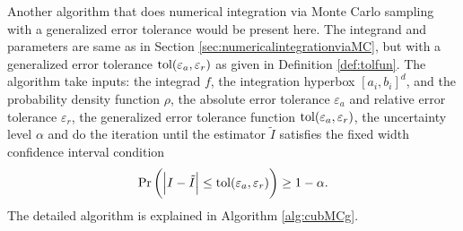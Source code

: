 \documentclass{iitthesis}
\begin{document}
\label{sec:cubmcgalg}
Another algorithm that does numerical integration via Monte Carlo sampling with a generalized error tolerance would be present here. The integrand and parameters are same as in Section \ref{sec:numericalintegrationviaMC}, but with a generalized error tolerance $\operatorname{tol}(\varepsilon_a, \varepsilon_r)$ as given in Definition \ref{def:tolfun}. The algorithm take inputs: the integrad $f$, the integration hyperbox $[a_i,b_i]^d$, and the probability density function $\rho$, the absolute error tolerance $\varepsilon_a$ and relative error tolerance $\varepsilon_r$, the generalized error tolerance function $\operatorname{tol}(\varepsilon_a,\varepsilon_r)$, the uncertainty level $\alpha$ and do the iteration until the estimator $\tilde{I}$ satisfies the fixed width confidence interval condition
\begin{align}\label{cubMCgCI}
\Pr \left(\left \lvert I-\tilde{I} \right \rvert \leq \operatorname{tol}(\varepsilon_a, \varepsilon_r)\right) \geq 1-\alpha.
\end{align}
The detailed algorithm is explained in Algorithm \ref{alg:cubMCg}.
\end{document}

